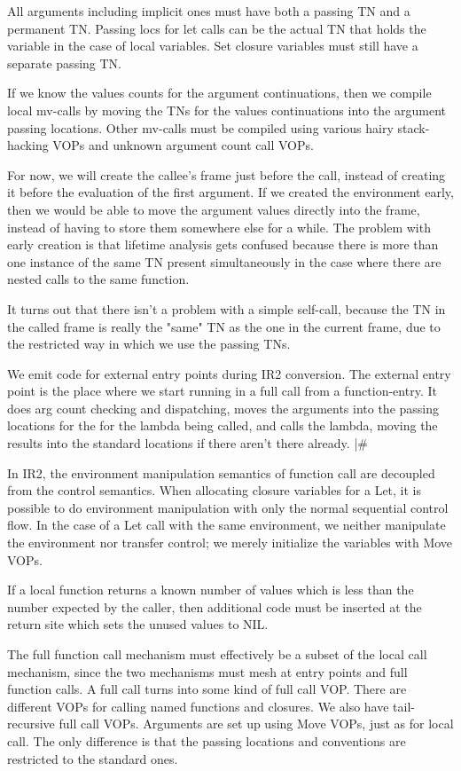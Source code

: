 {\begin{itemize, spread 0, spacing 1}
All arguments including implicit ones must have both a passing TN and a
permanent TN.  Passing locs for let calls can be the actual TN that holds the
variable in the case of local variables.  Set closure variables must still have
a separate passing TN.

If we know the values counts for the argument continuations, then we compile
local mv-calls by moving the TNs for the values continuations into the argument
passing locations.  Other mv-calls must be compiled using various hairy
stack-hacking VOPs and unknown argument count call VOPs.

For now, we will create the callee's frame just before the call, instead of
creating it before the evaluation of the first argument.  If we created the
environment early, then we would be able to move the argument values directly
into the frame, instead of having to store them somewhere else for a while.
The problem with early creation is that lifetime analysis gets confused because
there is more than one instance of the same TN present simultaneously in the
case where there are nested calls to the same function.

It turns out that there isn't a problem with a simple self-call, because the TN
in the called frame is really the "same" TN as the one in the current frame,
due to the restricted way in which we use the passing TNs.

We emit code for external entry points during IR2 conversion.  The external
entry point is the place where we start running in a full call from a
function-entry.  It does arg count checking and dispatching, moves the
arguments into the passing locations for the for the lambda being called, and
calls the lambda, moving the results into the standard locations if there
aren't there already.
|\#


In IR2, the environment manipulation semantics of function call are decoupled
from the control semantics.  When allocating closure variables for a Let, it is
possible to do environment manipulation with only the normal sequential control
flow.  In the case of a Let call with the same environment, we neither
manipulate the environment nor transfer control; we merely initialize the
variables with Move VOPs.

If a local function returns a known number of values which is less than the
number expected by the caller, then additional code must be inserted at the
return site which sets the unused values to NIL.

The full function call mechanism must effectively be a subset of the local call
mechanism, since the two mechanisms must mesh at entry points and full function
calls.  A full call turns into some kind of full call VOP.  There are different
VOPs for calling named functions and closures.  We also have tail-recursive
full call VOPs.  Arguments are set up using Move VOPs, just as for local call.
The only difference is that the passing locations and conventions are
restricted to the standard ones.


\end{itemize, spread 0, spacing 1}}
